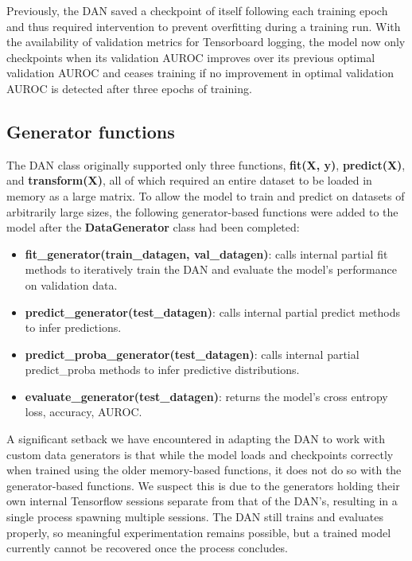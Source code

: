 \documentclass{proc}
\begin{document}
Previously, the DAN saved a checkpoint of itself following each training epoch and thus required intervention to prevent overfitting during a training run. With the availability of validation metrics for Tensorboard logging, the model now only checkpoints when its validation AUROC improves over its previous optimal validation AUROC and ceases training if no improvement in optimal validation AUROC is detected after three epochs of training.

\subsection{Generator functions}

The DAN class originally supported only three functions, \textbf{fit(X, y)}, \textbf{predict(X)}, and \textbf{transform(X)}, all of which required an entire dataset to be loaded in memory as a large matrix. To allow the model to train and predict on datasets of arbitrarily large sizes, the following generator-based functions were added to the model after the \textbf{DataGenerator} class had been completed:

\begin{itemize}
\item{\textbf{fit\_generator(train\_datagen, val\_datagen)}}: calls internal partial fit methods to iteratively train the DAN and evaluate the model's performance on validation data.
\item{\textbf{predict\_generator(test\_datagen)}}: calls internal partial predict methods to infer predictions.
\item{\textbf{predict\_proba\_generator(test\_datagen)}}: calls internal partial predict\_proba methods to infer predictive distributions.
\item{\textbf{evaluate\_generator(test\_datagen)}}: returns the model's cross entropy loss, accuracy, AUROC.
\end{itemize}

A significant setback we have encountered in adapting the DAN to work with custom data generators is that while the model loads and checkpoints correctly when trained using the older memory-based functions, it does not do so with the generator-based functions. We suspect this is due to the generators holding their own internal Tensorflow sessions separate from that of the DAN's, resulting in a single process spawning multiple sessions. The DAN still trains and evaluates properly, so meaningful experimentation remains possible, but a trained model currently cannot be recovered once the process concludes.
\end{document}
